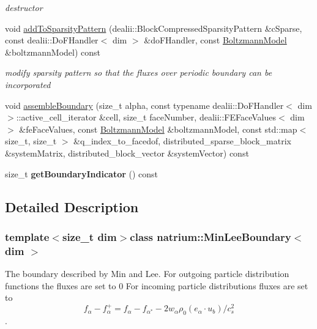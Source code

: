 \begin{DoxyCompactItemize}
\begin{DoxyCompactList}\small\item\em destructor \end{DoxyCompactList}\item 
void \hyperlink{classnatrium_1_1MinLeeBoundary_a873e55801ae7972803d50c7fb805c391}{add\-To\-Sparsity\-Pattern} (dealii\-::\-Block\-Compressed\-Sparsity\-Pattern \&c\-Sparse, const dealii\-::\-Do\-F\-Handler$<$ dim $>$ \&do\-F\-Handler, const \hyperlink{classnatrium_1_1BoltzmannModel}{Boltzmann\-Model} \&boltzmann\-Model) const 
\begin{DoxyCompactList}\small\item\em modify sparsity pattern so that the fluxes over periodic boundary can be incorporated \end{DoxyCompactList}\item 
void \hyperlink{classnatrium_1_1MinLeeBoundary_af546e18b114f794f8e8a6bf0c73ae5ed}{assemble\-Boundary} (size\-\_\-t alpha, const typename dealii\-::\-Do\-F\-Handler$<$ dim $>$\-::active\-\_\-cell\-\_\-iterator \&cell, size\-\_\-t face\-Number, dealii\-::\-F\-E\-Face\-Values$<$ dim $>$ \&fe\-Face\-Values, const \hyperlink{classnatrium_1_1BoltzmannModel}{Boltzmann\-Model} \&boltzmann\-Model, const std\-::map$<$ size\-\_\-t, size\-\_\-t $>$ \&q\-\_\-index\-\_\-to\-\_\-facedof, distributed\-\_\-sparse\-\_\-block\-\_\-matrix \&system\-Matrix, distributed\-\_\-block\-\_\-vector \&system\-Vector) const 
\item 
\hypertarget{classnatrium_1_1MinLeeBoundary_a050f00caec37ee8e2f6e19a4d3d2d1fc}{size\-\_\-t {\bfseries get\-Boundary\-Indicator} () const }\label{classnatrium_1_1MinLeeBoundary_a050f00caec37ee8e2f6e19a4d3d2d1fc}

\end{DoxyCompactItemize}


\subsection{Detailed Description}
\subsubsection*{template$<$size\-\_\-t dim$>$class natrium\-::\-Min\-Lee\-Boundary$<$ dim $>$}

The boundary described by Min and Lee. For outgoing particle distribution functions the fluxes are set to 0 For incoming particle distributions fluxes are set to \[ f_{\alpha} - f^{+}_{\alpha} = f_{\alpha} - f_{\alpha^{*}} - 2w_{\alpha} \rho_{0} (e_{\alpha}\cdot u_{b})/c^{2}_{s}\]. 


